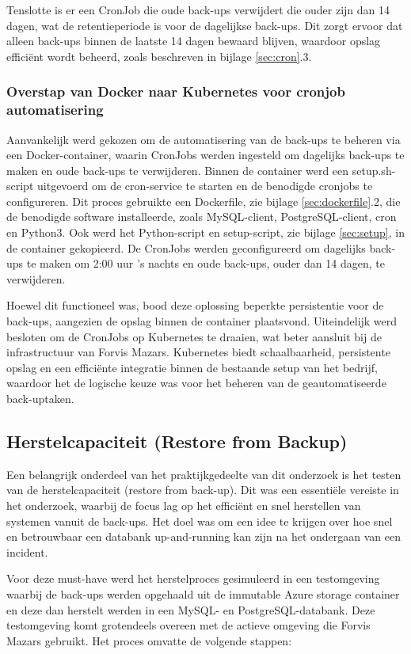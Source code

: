 Tenslotte is er een CronJob die oude back-ups verwijdert die ouder zijn dan 14 dagen, wat de retentieperiode is voor de dagelijkse back-ups. Dit zorgt ervoor dat alleen back-ups binnen de laatste 14 dagen bewaard blijven, waardoor opslag efficiënt wordt beheerd, zoals beschreven in bijlage \ref{sec:cron}.3.

\subsubsection{Overstap van Docker naar Kubernetes voor cronjob automatisering}
Aanvankelijk werd gekozen om de automatisering van de back-ups te beheren via een Docker-container, waarin CronJobs werden ingesteld om dagelijks back-ups te maken en oude back-ups te verwijderen. Binnen de container werd een setup.sh-script uitgevoerd om de cron-service te starten en de benodigde cronjobs te configureren. Dit proces gebruikte een Dockerfile, zie bijlage \ref{sec:dockerfile}.2, die de benodigde software installeerde, zoals MySQL-client, PostgreSQL-client, cron en Python3. Ook werd het Python-script en setup-script, zie bijlage \ref{sec:setup}, in de container gekopieerd. De CronJobs werden geconfigureerd om dagelijks back-ups te maken om 2:00 uur 's nachts en oude back-ups, ouder dan 14 dagen, te verwijderen.

Hoewel dit functioneel was, bood deze oplossing beperkte persistentie voor de back-ups, aangezien de opslag binnen de container plaatsvond. Uiteindelijk werd besloten om de CronJobs op Kubernetes te draaien, wat beter aansluit bij de infrastructuur van Forvis Mazars. Kubernetes biedt schaalbaarheid, persistente opslag en een efficiënte integratie binnen de bestaande setup van het bedrijf, waardoor het de logische keuze was voor het beheren van de geautomatiseerde back-uptaken.

\subsection{Herstelcapaciteit (Restore from Backup)}
Een belangrijk onderdeel van het praktijkgedeelte van dit onderzoek is het testen van de herstelcapaciteit (restore from back-up). Dit was een essentiële vereiste in het onderzoek, waarbij de focus lag op het efficiënt en snel herstellen van systemen vanuit de back-ups. Het doel was om een idee te krijgen over hoe snel en betrouwbaar een databank up-and-running kan zijn na het ondergaan van een incident.

Voor deze must-have werd het herstelproces gesimuleerd in een testomgeving waarbij de back-ups werden opgehaald uit de immutable Azure storage container en deze dan herstelt werden in een MySQL- en PostgreSQL-databank. Deze testomgeving komt grotendeels overeen met de actieve omgeving die Forvis Mazars gebruikt. Het proces omvatte de volgende stappen:

